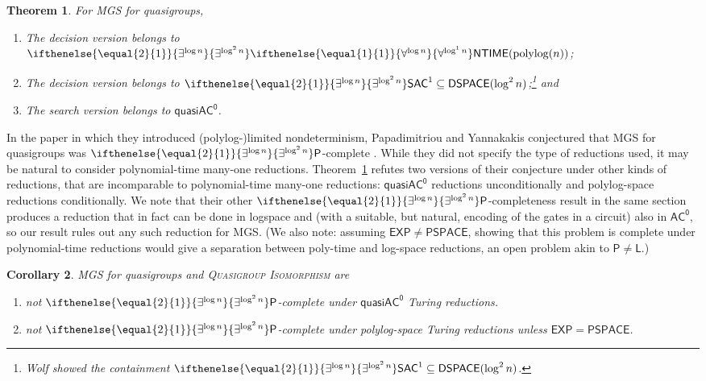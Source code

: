 \documentclass{article}
\newtheorem{theorem}{Theorem}\newtheorem{lemma}[theorem]{Lemma}\newtheorem{proposition}[theorem]{Proposition}\newtheorem{corollary}[theorem]{Corollary}\newtheorem{definition}[theorem]{Definition}\newtheorem{claim}[theorem]{Claim}\newtheorem{remark}[theorem]{Remark}\newtheorem{observation}[theorem]{Observation}\newtheorem{conjecture}[theorem]{Conjecture}\newtheorem{example}[theorem]{Example}
\newcommand{\algprobm}[1]{\textsc{#1}\xspace}
\newcommand{\betacc}[1]{\ifthenelse{\equal{#1}{1}}{\exists^{\log n}}{\exists^{\log^{#1}n}}} %
\newcommand{\alphacc}[1]{\ifthenelse{\equal{#1}{1}}{\forall^{\log n}}{\forall^{\log^{#1}n}}} %
\newcommand*{\ComplexityClass}[1]{\ensuremath{\mathsf{#1}}\xspace}
\renewcommand{\P}{\ComplexityClass{P}}
\newcommand*{\EXP}{\ComplexityClass{EXP}}
\newcommand*{\LogSpace}{\ComplexityClass{L}}
\newcommand*{\PSPACE}{\ComplexityClass{PSPACE}}
\newcommand{\SAC}{\ComplexityClass{SAC}}
\newcommand{\ACz}{\ComplexityClass{AC^0}}
\newcommand{\qACz}{\ComplexityClass{quasiAC^0}}
\newcommand{\NTIME}{\ComplexityClass{NTIME}}
\begin{document}
\begin{theorem} \label{thm:MGSqAC0}
For \algprobm{MGS} for quasigroups, 
\renewcommand{\theenumi}{\alph{enumi}}
\begin{enumerate}
\item \label{thm:MGSqAC0:NTIME} The decision version belongs to $\betacc{2}\alphacc{1}\NTIME(\mathrm{polylog}(n))$;

\item \label{thm:MGSqAC0:SAC} The decision version belongs to $\betacc{2}\SAC^{1} \subseteq \mathsf{DSPACE}(\log^2 n)$;\footnote{Wolf \cite{Wolf} showed the containment $\betacc{2}\SAC^{1} \subseteq \mathsf{DSPACE}(\log^{2} n)$.} and

\item \label{thm:MGSqAC0:search} The search version belongs to $\qACz$.
\end{enumerate}
\end{theorem}
In the paper in which they introduced (polylog-)limited nondeterminism, Papadimitriou and Yannakakis conjectured that MGS for quasigroups was $\betacc{2}\P$-complete \cite[after Thm.~7]{PY}. While they did not specify the type of reductions used, it may be natural to consider polynomial-time many-one reductions. Theorem~\ref{thm:MGSqAC0} refutes two versions of their conjecture under other kinds of reductions, that are incomparable to polynomial-time many-one reductions: $\qACz$ reductions unconditionally and polylog-space reductions conditionally. We note that their other $\betacc{2}\P$-completeness result in the same section produces a reduction that in fact can be done in logspace and (with a suitable, but natural, encoding of the gates in a circuit) also in $\ACz$, so our result rules out any such reduction for \algprobm{MGS}. 
(We also note: assuming $\EXP \neq \PSPACE$, showing that this problem is complete under polynomial-time reductions would give a separation between poly-time and log-space reductions, an open problem akin to $\P \neq \LogSpace$.) 


\renewcommand{\theenumi}{\alph{enumi}}
\begin{corollary}
\algprobm{MGS} for quasigroups and \algprobm{Quasigroup Isomorphism} are 
\begin{enumerate}
\item not $\betacc{2} \P$-complete under $\qACz$ Turing reductions. 

\item not $\betacc{2} \P$-complete under polylog-space Turing reductions unless $\mathsf{EXP} = \mathsf{PSPACE}$.
\end{enumerate}
\end{corollary}
\end{document}
